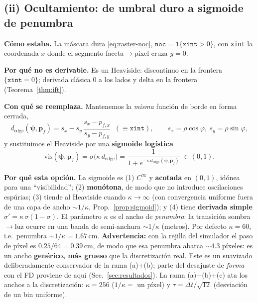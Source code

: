 \documentclass[11pt,a4paper]{article}
\theoremstyle{plain}
\theoremstyle{definition}
\newcommand{\vect}[1]{\boldsymbol{#1}}
\begin{document}
\subsection{(ii) Ocultamiento: de umbral duro a sigmoide de penumbra}
\label{sec:vis}

\textbf{C\'omo estaba.} La m\'ascara dura \eqref{eq:raster-noc},
$\texttt{noc}=\mathbf 1\{\texttt{xint}>0\}$, con \texttt{xint} la coordenada $x$
donde el segmento faceta$\to$p\'ixel cruza $y=0$.

\textbf{Por qu\'e no es derivable.} Es un Heaviside: discontinuo en la frontera
$\{\texttt{xint}=0\}$; derivada cl\'asica $0$ a los lados y delta en la frontera
(Teorema~\ref{thm:ift}).

\textbf{Con qu\'e se reemplaza.} Mantenemos la \emph{misma} funci\'on de borde en
forma cerrada,
\begin{equation}
    d_{\mathrm{edge}}(\vect{\psi},\vect{p}_f)
    =s_x - s_y\,\frac{s_x-p_{f,x}}{s_y-p_{f,y}}
    \;\;(\equiv\texttt{xint}),
    \qquad s_x=\rho\cos\varphi,\ s_y=\rho\sin\varphi,
    \label{eq:dedge}
\end{equation}
y sustituimos el Heaviside por una \textbf{sigmoide log\'istica}
\begin{equation}
    \boxed{\;
    \mathrm{vis}(\vect{\psi},\vect{p}_f)
    =\sigma\!\bigl(\kappa\,d_{\mathrm{edge}}\bigr)
    =\frac{1}{1+e^{-\kappa\, d_{\mathrm{edge}}(\vect{\psi},\vect{p}_f)}}
    \;\in(0,1).
    \;}
    \label{eq:sigmoid}
\end{equation}

\textbf{Por qu\'e esta opci\'on.} La sigmoide es (1) $C^\infty$ y \textbf{acotada}
en $(0,1)$, id\'onea para una ``visibilidad''; (2) \textbf{mon\'otona}, de modo que
no introduce oscilaciones esp\'urias; (3) tiende al Heaviside cuando
$\kappa\to\infty$ (con convergencia uniforme fuera de una capa de ancho
$\sim1/\kappa$, Prop.~\ref{prop:sigmoid}); y (4) tiene \textbf{derivada simple}
$\sigma'=\kappa\,\sigma(1-\sigma)$. El par\'ametro $\kappa$ es el ancho de
\emph{penumbra}: la transici\'on sombra$\to$luz ocurre en una banda de
semi-anchura $\sim1/\kappa$ (metros). Por defecto $\kappa=60$, i.e.\ penumbra
$\sim1/\kappa=1.67$\,cm. \textbf{Advertencia:} con la rejilla del simulador el
paso de p\'ixel es $0.25/64=0.39$\,cm, de modo que esa penumbra abarca
$\sim4.3$ p\'ixeles: es un ancho \textbf{gen\'erico, m\'as grueso} que la
discretizaci\'on real. Este es un suavizado deliberadamente conservador de la
rama (a)+(b); parte del desajuste de \emph{forma} con el FD proviene de aqu\'i
(Sec.~\ref{sec:resultados}). La rama (a)+(b)+(c) ata los anchos a la
discretizaci\'on: $\kappa=256$ ($1/\kappa=$ un p\'ixel) y $\tau=\Delta t/\sqrt{12}$
(desviaci\'on de un bin uniforme).
\end{document}
